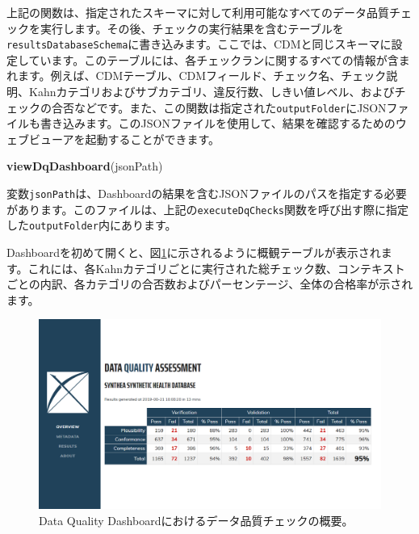 \documentclass[
  11pt]{book}
\newenvironment{Shaded}{\begin{snugshade}}{\end{snugshade}}
\newcommand{\FunctionTok}[1]{\textcolor[rgb]{0.13,0.29,0.53}{\textbf{#1}}}
\newcommand{\NormalTok}[1]{#1}
\theoremstyle{definition}
\theoremstyle{definition}
\theoremstyle{definition}
\theoremstyle{definition}
\theoremstyle{remark}
\begin{document}
上記の関数は、指定されたスキーマに対して利用可能なすべてのデータ品質チェックを実行します。その後、チェックの実行結果を含むテーブルを\texttt{resultsDatabaseSchema}に書き込みます。ここでは、CDMと同じスキーマに設定しています。このテーブルには、各チェックランに関するすべての情報が含まれます。例えば、CDMテーブル、CDMフィールド、チェック名、チェック説明、Kahnカテゴリおよびサブカテゴリ、違反行数、しきい値レベル、およびチェックの合否などです。また、この関数は指定された\texttt{outputFolder}にJSONファイルも書き込みます。このJSONファイルを使用して、結果を確認するためのウェブビューアを起動することができます。

\begin{Shaded}
\begin{Highlighting}[]
\FunctionTok{viewDqDashboard}\NormalTok{(jsonPath)}
\end{Highlighting}
\end{Shaded}

変数\texttt{jsonPath}は、Dashboardの結果を含むJSONファイルのパスを指定する必要があります。このファイルは、上記の\texttt{executeDqChecks}関数を呼び出す際に指定した\texttt{outputFolder}内にあります。

Dashboardを初めて開くと、図\ref{fig:dqdOverview}に示されるように概観テーブルが表示されます。これには、各Kahnカテゴリごとに実行された総チェック数、コンテキストごとの内訳、各カテゴリの合否数およびパーセンテージ、全体の合格率が示されます。

\begin{figure}

{\centering \includegraphics[width=1\linewidth]{images/DataQuality/dqdOverview} 

}

\caption{Data Quality Dashboardにおけるデータ品質チェックの概要。}\label{fig:dqdOverview}
\end{figure}
\end{document}
